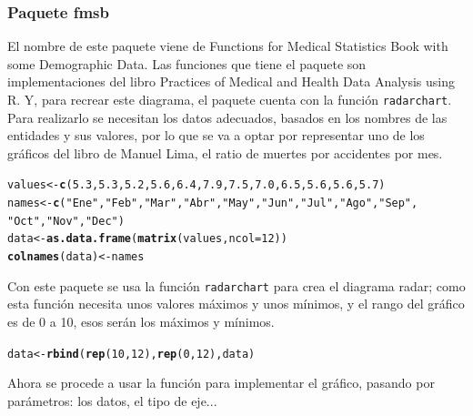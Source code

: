 \documentclass{article}\usepackage[]{graphicx}\usepackage[]{color}
\makeatletter
\newcommand{\hlnum}[1]{\textcolor[rgb]{0.686,0.059,0.569}{#1}}%
\newcommand{\hlstr}[1]{\textcolor[rgb]{0.192,0.494,0.8}{#1}}%
\newcommand{\hlstd}[1]{\textcolor[rgb]{0.345,0.345,0.345}{#1}}%
\newcommand{\hlkwb}[1]{\textcolor[rgb]{0.69,0.353,0.396}{#1}}%
\newcommand{\hlkwc}[1]{\textcolor[rgb]{0.333,0.667,0.333}{#1}}%
\newcommand{\hlkwd}[1]{\textcolor[rgb]{0.737,0.353,0.396}{\textbf{#1}}}%
\newenvironment{kframe}{%
 \def\at@end@of@kframe{}%
 \ifinner\ifhmode%
  \def\at@end@of@kframe{\end{minipage}}%
  \begin{minipage}{\columnwidth}%
 \fi\fi%
 \def\FrameCommand##1{\hskip\@totalleftmargin \hskip-\fboxsep
 \colorbox{shadecolor}{##1}\hskip-\fboxsep
     \hskip-\linewidth \hskip-\@totalleftmargin \hskip\columnwidth}%
 \MakeFramed {\advance\hsize-\width
   \@totalleftmargin\z@ \linewidth\hsize
   \@setminipage}}%
 {\par\unskip\endMakeFramed%
 \at@end@of@kframe}
\newenvironment{knitrout}{}{} %
\makeatother
\begin{document}
\subsubsection{Paquete fmsb}
El nombre de este paquete\cite{docu_fmsb} viene de Functions for Medical Statistics Book with some Demographic Data. Las funciones que tiene el paquete son implementaciones del libro Practices of Medical and Health Data Analysis using R. Y, para recrear este diagrama, el paquete cuenta con la funci\'on \texttt{radarchart}.
Para realizarlo se necesitan los datos adecuados, basados en los nombres de las entidades y sus valores, por lo que se va a optar por representar uno de los gr\'aficos del libro de Manuel Lima\cite[p\'ag 151]{Circle}, el ratio de muertes por accidentes por mes.
\begin{knitrout}
\color{fgcolor}\begin{kframe}
\begin{alltt}
\hlstd{values} \hlkwb{<-} \hlkwd{c}\hlstd{(}\hlnum{5.3}\hlstd{,} \hlnum{5.3}\hlstd{,} \hlnum{5.2}\hlstd{,} \hlnum{5.6}\hlstd{,} \hlnum{6.4}\hlstd{,} \hlnum{7.9}\hlstd{,} \hlnum{7.5}\hlstd{,} \hlnum{7.0}\hlstd{,} \hlnum{6.5}\hlstd{,} \hlnum{5.6}\hlstd{,} \hlnum{5.6}\hlstd{,} \hlnum{5.7}\hlstd{)}
\hlstd{names} \hlkwb{<-} \hlkwd{c}\hlstd{(}\hlstr{"Ene"}\hlstd{,} \hlstr{"Feb"}\hlstd{,} \hlstr{"Mar"}\hlstd{,} \hlstr{"Abr"}\hlstd{,} \hlstr{"May"}\hlstd{,} \hlstr{"Jun"}\hlstd{,} \hlstr{"Jul"}\hlstd{,} \hlstr{"Ago"}\hlstd{,} \hlstr{"Sep"}\hlstd{,}
           \hlstr{"Oct"}\hlstd{,} \hlstr{"Nov"}\hlstd{,} \hlstr{"Dec"}\hlstd{)}
\hlstd{data} \hlkwb{<-} \hlkwd{as.data.frame}\hlstd{(}\hlkwd{matrix}\hlstd{(values,} \hlkwc{ncol} \hlstd{=} \hlnum{12}\hlstd{))}
\hlkwd{colnames}\hlstd{(data)} \hlkwb{<-} \hlstd{names}
\end{alltt}
\end{kframe}
\end{knitrout}
Con este paquete se usa la funci\'on \texttt{radarchart} para crea el diagrama radar; como esta funci\'on necesita unos valores m\'aximos y unos m\'inimos, y el rango del gr\'afico es de 0 a 10, esos ser\'an los m\'aximos y m\'inimos.
\begin{knitrout}
\color{fgcolor}\begin{kframe}
\begin{alltt}
\hlstd{data} \hlkwb{<-} \hlkwd{rbind}\hlstd{(}\hlkwd{rep}\hlstd{(}\hlnum{10}\hlstd{,}\hlnum{12}\hlstd{),} \hlkwd{rep}\hlstd{(}\hlnum{0}\hlstd{,}\hlnum{12}\hlstd{), data)}
\end{alltt}
\end{kframe}
\end{knitrout}
Ahora se procede a usar la funci\'on para implementar el gr\'afico, pasando por par\'ametros: los datos, el tipo de eje...
\end{document}
